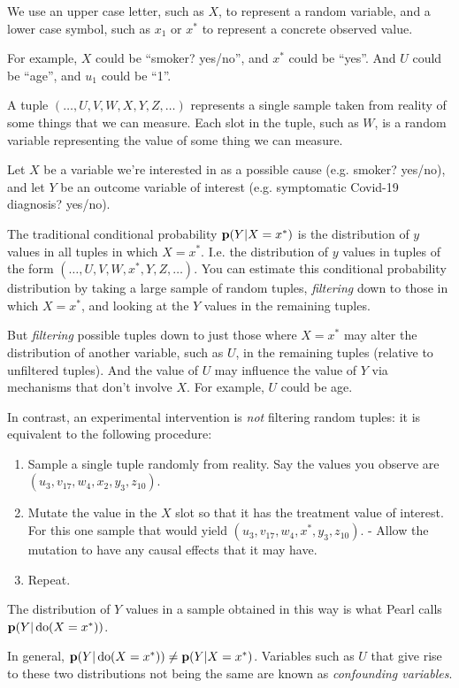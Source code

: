 We use an upper case letter, such as $X$, to represent a random variable, and a lower case symbol, such
as $x_1$ or $x^*$ to represent a concrete observed value.

For example, $X$ could be ``smoker? yes/no'', and $x^*$ could be ``yes''. And $U$ could be ``age'', and $u_1$
could be ``1''.

A tuple $(\ldots, U, V, W, X, Y, Z, \ldots)$ represents a single sample taken from reality of some things that
we can measure. Each slot in the tuple, such as $W$, is a random variable representing the value of some thing
we can measure.

Let $X$ be a variable we're interested in as a possible cause (e.g. smoker? yes/no), and let $Y$ be
an outcome variable of interest (e.g. symptomatic Covid-19 diagnosis? yes/no).

The traditional conditional probability $\mathbf{p}(Y|X=x^*)$ is the distribution of $y$ values in all tuples in
which $X=x^*$. I.e. the distribution of $y$ values in tuples of the
form $(\ldots, U, V, W, x^*, Y, Z, \ldots)$. You can estimate this conditional probability distribution by
taking a large sample of random tuples, {\it filtering} down to those in which $X=x^*$, and looking at the $Y$ values in
the remaining tuples.

But {\it filtering} possible tuples down to just those where $X=x^*$ may alter the distribution of another variable, such
as $U$, in the remaining tuples (relative to unfiltered tuples). And the value of $U$ may influence the value
of $Y$ via mechanisms that don't involve $X$. For example, $U$ could be age.

In contrast, an experimental intervention is {\it not} filtering random tuples: it is equivalent to the following procedure:
\begin{enumerate}
\item Sample a single tuple randomly from reality. Say the values you observe are $(u_3, v_{17}, w_4, x_2, y_3, z_{10})$.
\item Mutate the value in the $X$ slot so that it has the treatment value of interest. For this one sample that
  would yield $(u_3, v_{17}, w_4, x^*, y_3, z_{10})$.
- Allow the mutation to have any causal effects that it may have.
\item Repeat.
\end{enumerate}
The distribution of $Y$ values in a sample obtained in this way is what Pearl calls $\mathbf{p}(Y|\operatorname{\text{do}}(X = x^*))$.

In general, $\mathbf{p}(Y|\operatorname{\text{do}}(X = x^*)) \neq \mathbf{p}(Y|X=x^*)$. Variables such as $U$ that give rise to these two
distributions not being the same are known as {\it confounding variables}.

